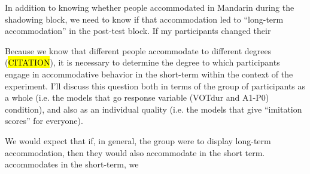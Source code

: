 In addition to knowing whether people accommodated in Mandarin during the shadowing block, we need to know if that accommodation led to ``long-term accommodation'' in the post-test block. If my participants changed their 

Because we know that different people accommodate to different degrees (\hl{CITATION}), it is necessary to determine the degree to which participants engage in accommodative behavior in the short-term within the context of the experiment. I'll discuss this question both in terms of the group of participants as a whole (i.e. the models that go response variable (VOTdur and A1-P0) ~ condition), and also as an individual quality (i.e. the models that give ``imitation scores'' for everyone).

We would expect that if, in general, the group were to display long-term accommodation, then they would also accommodate in the short term. accommodates in the short-term, we 


